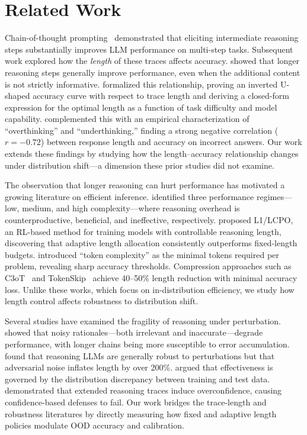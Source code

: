 \section{Related Work}
\label{sec:related}

Chain-of-thought prompting~\citep{wei2022chainofthought} demonstrated that eliciting intermediate reasoning steps substantially improves LLM performance on multi-step tasks. Subsequent work explored how the \emph{length} of these traces affects accuracy. \citet{jin2024impact} showed that longer reasoning steps generally improve performance, even when the additional content is not strictly informative. \citet{wu2025whenmoreisless} formalized this relationship, proving an inverted U-shaped accuracy curve with respect to trace length and deriving a closed-form expression for the optimal length as a function of task difficulty and model capability. \citet{su2025underthinkingoverthinking} complemented this with an empirical characterization of ``overthinking'' and ``underthinking,'' finding a strong negative correlation ($r = -0.72$) between response length and accuracy on incorrect answers. Our work extends these findings by studying how the length--accuracy relationship changes under distribution shift---a dimension these prior studies did not examine.

The observation that longer reasoning can hurt performance has motivated a growing literature on efficient inference. \citet{shojaee2025illusion} identified three performance regimes---low, medium, and high complexity---where reasoning overhead is counterproductive, beneficial, and ineffective, respectively. \citet{aggarwal2025l1} proposed L1/LCPO, an RL-based method for training models with controllable reasoning length, discovering that adaptive length allocation consistently outperforms fixed-length budgets. \citet{lee2025tokencomplexity} introduced ``token complexity'' as the minimal tokens required per problem, revealing sharp accuracy thresholds. Compression approaches such as C3oT~\citep{kang2024c3ot} and TokenSkip~\citep{xia2025tokenskip} achieve 40--50\% length reduction with minimal accuracy loss. Unlike these works, which focus on in-distribution efficiency, we study how length control affects robustness to distribution shift.

Several studies have examined the fragility of \CoT reasoning under perturbation. \citet{wang2024nora} showed that noisy rationales---both irrelevant and inaccurate---degrade \CoT performance, with longer chains being more susceptible to error accumulation. \citet{vonrecum2026interventions} found that reasoning LLMs are generally robust to perturbations but that adversarial noise inflates \CoT length by over 200\%. \citet{li2025mirage} argued that \CoT effectiveness is governed by the distribution discrepancy between training and test data. \citet{liyubo2026consistency} demonstrated that extended reasoning traces induce overconfidence, causing confidence-based defenses to fail. Our work bridges the trace-length and robustness literatures by directly measuring how fixed and adaptive length policies modulate OOD accuracy and calibration.

